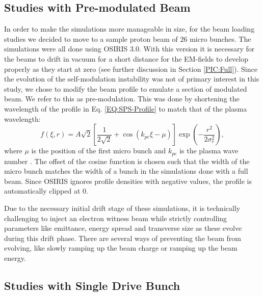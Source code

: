 

\subsection{Studies with Pre-modulated Beam}
\label{Sim:PBPreMod}

In order to make the simulations more manageable in size, for the beam loading studies we decided to move to a sample proton beam of $26$ micro bunches. The simulations were all done using OSIRIS 3.0. With this version it is necessary for the beams to drift in vacuum for a short distance for the EM-fields to develop properly as they start at zero (see further discussion in Section \ref{PIC:Full}). Since the evolution of the self-modulation instability was not of primary interest in this study, we chose to modify the beam profile to emulate a section of modulated beam. We refer to this as pre-modulation. This was done by shortening the wavelength of the profile in Eq. \ref{EQ:SPS-Profile} to match that of the plasma wavelength:
\begin{equation}
    f(\xi,r) = A\sqrt{2} \left[\frac{1}{2\sqrt{2}} + \cos\left(k_{pe}\xi - \mu\right)\right] \exp\left(-\frac{r^{2}}{2\sigma_{r}^{2}}\right), \label{EQ:PB-PreMod}
\end{equation}
where $\mu$ is the position of the first micro bunch and $k_{pe}$ is the plasma wave number \cite{berglyd_olsen:2015}. The offset of the cosine function is chosen such that the width of the micro bunch matches the width of a bunch in the simulations done with a full beam. Since OSIRIS ignores profile densities with negative values, the profile is automatically clipped at $0$.

Due to the necessary initial drift stage of these simulations, it is technically challenging to inject an electron witness beam while strictly controlling parameters like emittance, energy spread and transverse size as these evolve during this drift phase. There are several ways of preventing the beam from evolving, like slowly ramping up the beam charge or ramping up the beam energy. 


\subsection{Studies with Single Drive Bunch}
\label{Sim:PBSingle}


